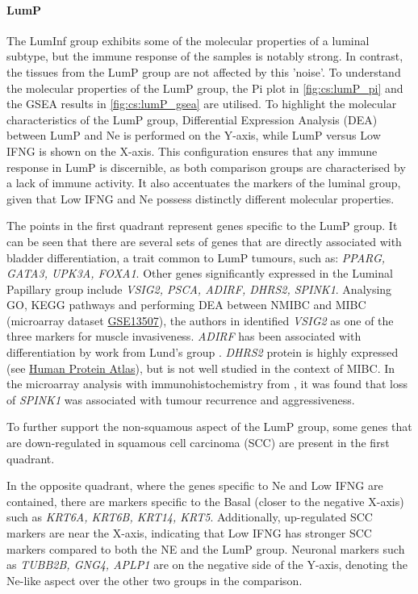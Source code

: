 \paragraph*{LumP}

The LumInf group exhibits some of the molecular properties of a luminal subtype, but the immune response of the samples is notably strong. In contrast, the tissues from the LumP group are not affected by this 'noise'. To understand the molecular properties of the LumP group, the Pi plot in \cref{fig:cs:lumP_pi} and the GSEA results in \cref{fig:cs:lumP_gsea} are utilised. To highlight the molecular characteristics of the LumP group, Differential Expression Analysis (DEA) between LumP and Ne is performed on the Y-axis, while LumP versus Low IFNG is shown on the X-axis. This configuration ensures that any immune response in LumP is discernible, as both comparison groups are characterised by a lack of immune activity. It also accentuates the markers of the luminal group, given that Low IFNG and Ne possess distinctly different molecular properties.

The points in the first quadrant represent genes specific to the LumP group. It can be seen that there are several sets of genes that are directly associated with bladder differentiation, a trait common to LumP tumours, such as: \textit{PPARG, GATA3, UPK3A, FOXA1}. Other genes significantly expressed in the Luminal Papillary group include \textit{VSIG2, PSCA, ADIRF, DHRS2, SPINK1}. Analysing GO, KEGG pathways and performing DEA between NMIBC and MIBC (microarray dataset \href{https://www.ncbi.nlm.nih.gov/geo/query/acc.cgi?acc=GSE13507}{GSE13507}), the authors in \citet{He2021-de} identified \textit{VSIG2} as one of the three markers for muscle invasiveness. \textit{ADIRF} has been associated with differentiation by work from Lund's group \citet{Eriksson2015-lt}. \textit{DHRS2} protein is highly expressed (see \href{https://www.proteinatlas.org/ENSG00000100867-DHRS2/tissue/urinary+bladder}{Human Protein Atlas}), but is not well studied in the context of MIBC. In the microarray analysis with immunohistochemistry from \citet{Rink2013-sv}, it was found that loss of \textit{SPINK1} was associated with tumour recurrence and aggressiveness.

To further support the non-squamous aspect of the LumP group, some genes that are down-regulated in squamous cell carcinoma (SCC) \citet{Knowles2015-mu} are present in the first quadrant.

In the opposite quadrant, where the genes specific to Ne and Low IFNG are contained, there are markers specific to the Basal (closer to the negative X-axis) such as \textit{KRT6A, KRT6B, KRT14, KRT5}. Additionally, up-regulated SCC markers are near the X-axis, indicating that Low IFNG has stronger SCC markers compared to both the NE and the LumP group. Neuronal markers such as \textit{TUBB2B, GNG4, APLP1} are on the negative side of the Y-axis, denoting the Ne-like aspect over the other two groups in the comparison.

